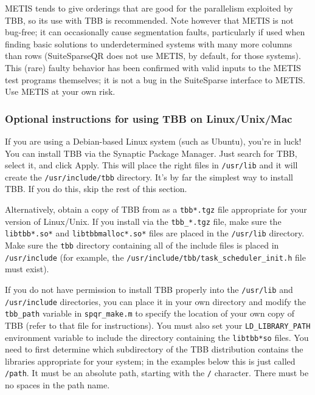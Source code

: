 \documentclass[12pt]{article}
\begin{document}
METIS tends to give orderings that are good for the parallelism exploited by
TBB, so its use with TBB is recommended.  Note however that METIS is not
bug-free; it can occasionally cause segmentation faults, particularly if used
when finding basic solutions to underdetermined systems with many more columns
than rows (SuiteSparseQR does not use METIS, by default, for those systems).
This (rare) faulty behavior has been confirmed with valid inputs to the METIS
test programs themselves; it is not a bug in the SuiteSparse interface to
METIS.  Use METIS at your own risk.

\subsubsection{Optional instructions for using TBB on Linux/Unix/Mac}

If you are using a Debian-based Linux system (such as Ubuntu), you're in luck!
You can install TBB via the Synaptic Package Manager.  Just search for TBB,
select it, and click Apply.  This will place the right files in \verb'/usr/lib'
and it will create the \verb'/usr/include/tbb' directory.  It's by far the
simplest way to install TBB.  If you do this, skip the rest of this section.

Alternatively, obtain a copy of TBB from
as a \verb'tbb*.tgz' file appropriate for your version of Linux/Unix.  If you
install via the \verb'tbb_*.tgz' file, make sure the \verb'libtbb*.so*' and
\verb'libtbbmalloc*.so*' files are placed in the \verb'/usr/lib' directory.
Make sure the \verb'tbb' directory containing all of the include files is
placed in \verb'/usr/include' (for example, the
\verb'/usr/include/tbb/task_scheduler_init.h' file must exist).

If you do not have permission to install TBB properly into the \verb'/usr/lib'
and \verb'/usr/include' directories, you can place it in your own directory and
modify the \verb'tbb_path' variable in \verb'spqr_make.m' to specify
the location of your own copy of TBB (refer to that file for instructions).
You must also set your \verb'LD_LIBRARY_PATH' environment variable to include
the directory containing the \verb'libtbb*so' files.  You need to first
determine which subdirectory of the TBB distribution contains the libraries
appropriate for your system; in the examples below this is just called
\verb'/path'.  It must be an absolute path, starting with the \verb'/'
character.  There must be no spaces in the path name.
\end{document}
